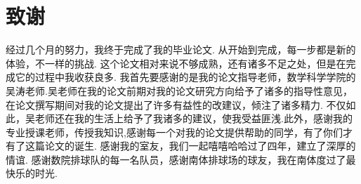 \chapter{致谢}
经过几个月的努力，我终于完成了我的毕业论文.
从开始到完成，每一步都是新的体验，不一样的挑战.
这个论文相对来说不够成熟，还有诸多不足之处，但是在完成它的过程中我收获良多.
我首先要感谢的是我的论文指导老师，数学科学学院的吴涛老师.吴老师在我的论文前期对我的论文研究方向给予了诸多的指导性意见，在论文撰写期间对我的论文提出了许多有益性的改建议，倾注了诸多精力.
不仅如此，吴老师还在我的生活上给予了我诸多的建议，使我受益匪浅.此外，感谢我的专业授课老师，传授我知识,感谢每一个对我的论文提供帮助的同学，有了你们才有了这篇论文的诞生.
感谢我的室友，我们一起嘻嘻哈哈过了四年，建立了深厚的情谊.
感谢数院排球队的每一名队员，感谢南体排球场的球友，我在南体度过了最快乐的时光.